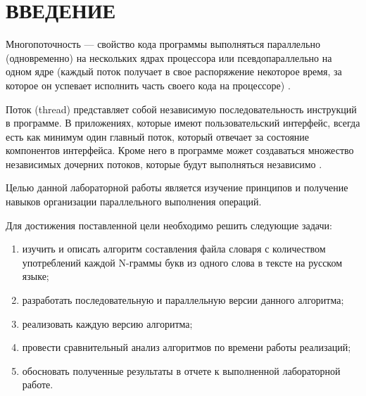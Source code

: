 \chapter*{ВВЕДЕНИЕ}

Многопоточность --- свойство кода программы выполняться параллельно
(одновременно) на нескольких ядрах процессора или псевдопараллельно
на одном ядре (каждый поток получает в свое распоряжение некоторое время, за
которое он успевает исполнить часть своего кода на процессоре) \cite{info_multithreading}.

Поток (thread) представляет собой независимую последовательность инструкций в
программе. 
В приложениях, которые имеют пользовательский интерфейс, всегда есть
как минимум один главный поток, который отвечает за состояние компонентов
интерфейса. 
Кроме него в программе может создаваться множество независимых
дочерних потоков, которые будут выполняться независимо \cite{info_multithreading}.

Целью данной лабораторной работы является изучение принципов и
получение навыков организации параллельного выполнения операций.

Для достижения поставленной цели необходимо решить следующие задачи:

\begin{enumerate}[label={\arabic*)}]
	\item изучить и описать алгоритм составления файла словаря с количеством употреблений каждой N-граммы букв из одного слова в тексте на русском языке;
	\item разработать последовательную и параллельную версии данного алгоритма;
	\item реализовать каждую версию алгоритма;
	\item провести сравнительный анализ алгоритмов по времени работы реализаций;
	\item обосновать полученные результаты в отчете к выполненной лабораторной работе.
\end{enumerate}
